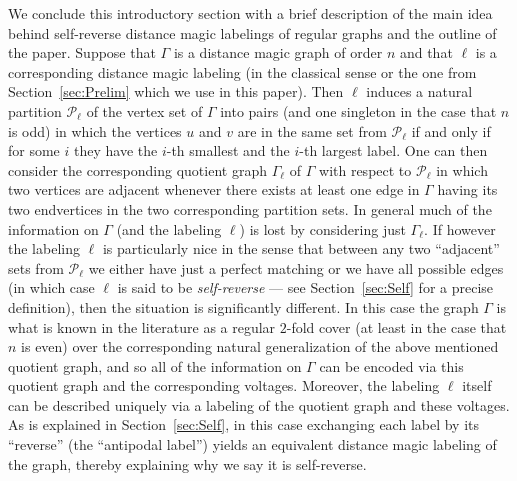 \documentclass[11 pt,english]{article}
\newcommand{\G}{\Gamma}
\newcommand{\cP}{\mathcal{P}}
\theoremstyle{definition}
\begin{document}
We conclude this introductory section with a brief description of the main idea behind self-reverse distance magic labelings of regular graphs and the outline of the paper. Suppose that $\G$ is a distance magic graph of order $n$ and that $\ell$ is a corresponding distance magic labeling (in the classical sense or the one from Section~\ref{sec:Prelim} which we use in this paper). Then $\ell$ induces a natural partition $\cP_\ell$ of the vertex set of $\G$ into pairs (and one singleton in the case that $n$ is odd) in which the vertices $u$ and $v$ are in the same set from $\cP_\ell$ if and only if for some $i$ they have the $i$-th smallest and the $i$-th largest label. One can then consider the corresponding quotient graph $\G_\ell$ of $\G$ with respect to $\cP_\ell$ in which two vertices are adjacent whenever there exists at least one edge in $\G$ having its two endvertices in the two corresponding partition sets. In general much of the information on $\G$ (and the labeling $\ell$) is lost by considering just $\G_\ell$. If however the labeling $\ell$ is particularly nice in the sense that between any two ``adjacent'' sets from $\cP_\ell$ we either have just a perfect matching or we have all possible edges (in which case $\ell$ is said to be {\em self-reverse} --- see Section~\ref{sec:Self} for a precise definition), then the situation is significantly different. In this case the graph $\G$ is what is known in the literature as a regular $2$-fold cover (at least in the case that $n$ is even) over the corresponding natural generalization of the above mentioned quotient graph, and so all of the information on $\G$ can be encoded via this quotient graph and the corresponding voltages. Moreover, the labeling $\ell$ itself can be described uniquely via a labeling of the quotient graph and these voltages. As is explained in Section~\ref{sec:Self}, in this case exchanging each label by its ``reverse'' (the ``antipodal label'') yields an equivalent distance magic labeling of the graph, thereby explaining why we say it is self-reverse. 
\end{document}
